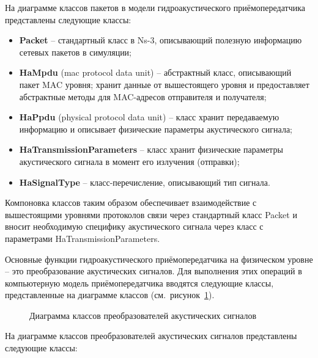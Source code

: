 \documentclass[
    numbers=section,
    document-code={ВКРБ--09.03.04--10.19--XX--26--81}
]{../latex/fqw}
\begin{document}
    На диаграмме классов пакетов в модели гидроакустического приёмопередатчика представлены следующие классы:

    \begin{itemize}
        \item
        \textbf{Packet} -- стандартный класс в Ns-3, описывающий полезную информацию сетевых пакетов в симуляции;
        \item
        \textbf{HaMpdu} (mac protocol data unit) -- абстрактный класс, описывающий пакет MAC уровня;
        хранит данные от вышестоящего уровня и предоставляет абстрактные методы для MAC-адресов
        отправителя и получателя;
        \item
        \textbf{HaPpdu} (physical protocol data unit) -- класс хранит передаваемую информацию и
        описывает физические параметры акустического сигнала;
        \item
        \textbf{HaTransmissionParameters} -- класс хранит физические параметры акустического сигнала в
        момент его излучения (отправки);
        \item
        \textbf{HaSignalType} -- класс-перечисление, описывающий тип сигнала.
    \end{itemize}

    Компоновка классов таким образом обеспечивает взаимодействие с вышестоящими уровнями протоколов связи
    через стандартный класс Packet и вносит необходимую специфику акустического сигнала через класс с
    параметрами HaTransmissionParameters.

    Основные функции гидроакустического приёмопередатчика на физическом уровне -- это
    преобразование акустических сигналов.
    Для выполнения этих операций в компьютерную модель приёмопередатчика вводятся следующие классы,
    представленные на диаграмме классов (см.~рисунок~\ref{fig:сlass_diagram_of_acoustic_signal_converters}).

    \begin{figure}[H]
        \centering
        \fbox{\rule{0pt}{20mm}\rule{40mm}{0pt}}
        \caption{Диаграмма классов преобразователей акустических сигналов}
        \label{fig:сlass_diagram_of_acoustic_signal_converters}
    \end{figure}

    На диаграмме классов преобразователей акустических сигналов представлены следующие классы:
\end{document}
